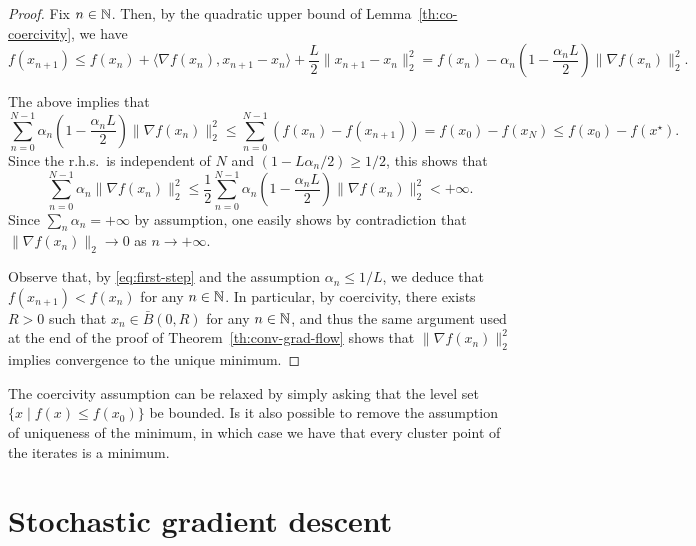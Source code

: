 \documentclass{report}
\begin{document}
\begin{proof}
	Fix $n\in\mathbb{N}$.
	Then, by the quadratic upper bound of Lemma~\ref{th:co-coercivity}, we have
	\begin{equation}
		\label{eq:first-step}
			f(x_{n+1}) 
			\le f(x_n) + \langle \nabla f(x_n), x_{n+1}-x_n \rangle+\frac{L}2\|x_{n+1}-x_n\|_2^2
			= f(x_n)-\alpha_n \left(1-\frac{\alpha_n L}2\right) \|\nabla f(x_n)\|_2^2.
	\end{equation}

	The above implies that 
	\begin{equation}
		\sum_{n=0}^{N-1} \alpha_n \left(1-\frac{\alpha_n L}2\right) \|\nabla f(x_n)\|_2^2 \le \sum_{n=0}^{N-1} \left(f(x_{n})-f(x_{n+1})\right) =f(x_0) - f(x_N) \le f(x_0)-f(x^\star).
	\end{equation}
	Since the r.h.s.~is independent of $N$ and $(1-L\alpha_n/2) \ge 1/2$, this shows that 
	\begin{equation}
		\sum_{n=0}^{N-1} \alpha_n  \|\nabla f(x_n)\|_2^2 \le
		\frac12\sum_{n=0}^{N-1} \alpha_n \left(1-\frac{\alpha_n L}2\right) \|\nabla f(x_n)\|_2^2 < +\infty.
	\end{equation}
	Since $\sum_n \alpha_n = +\infty$ by assumption, one easily shows by contradiction that $\|\nabla f(x_n)\|_2\rightarrow 0$ as $n\to +\infty$. 

	Observe that, by \eqref{eq:first-step} and the assumption $\alpha_n\le 1/L$, we deduce that $f(x_{n+1})<f(x_n)$ for any $n\in \mathbb{N}$. In particular, by coercivity, there exists $R>0$ such that $x_n\in \bar B(0,R)$ for any $n\in \mathbb{N}$, and thus the same argument used at the end of the proof of Theorem~\ref{th:conv-grad-flow} shows that $\|\nabla f(x_n)\|_2^2$ implies convergence to the unique minimum.
\end{proof}

\begin{remark}
	The coercivity assumption can be relaxed by simply asking that the level set $\{x\mid f(x)\le f(x_0)\}$ be bounded. 
	Is it also possible to remove the assumption of uniqueness of the minimum, in which case we have that every cluster point of the iterates is a minimum.
\end{remark}

\section{Stochastic gradient descent}
\end{document}
